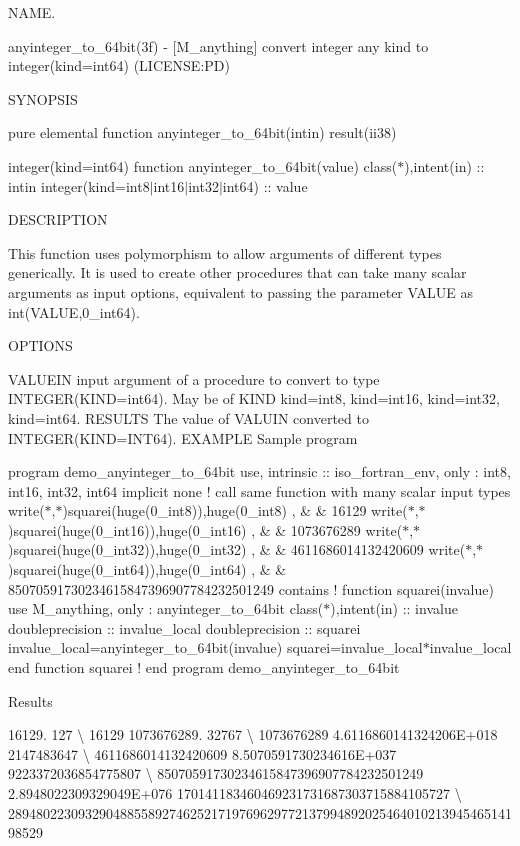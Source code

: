 N\+A\+ME. 

anyinteger\+\_\+to\+\_\+64bit(3f) -\/ \mbox{[}M\+\_\+anything\mbox{]} convert integer any kind to integer(kind=int64) (L\+I\+C\+E\+N\+SE\+:PD)

S\+Y\+N\+O\+P\+S\+IS

pure elemental function anyinteger\+\_\+to\+\_\+64bit(intin) result(ii38)

integer(kind=int64) function anyinteger\+\_\+to\+\_\+64bit(value) class($\ast$),intent(in) \+:\+: intin integer(kind=int8$\vert$int16$\vert$int32$\vert$int64) \+:\+: value

D\+E\+S\+C\+R\+I\+P\+T\+I\+ON

This function uses polymorphism to allow arguments of different types generically. It is used to create other procedures that can take many scalar arguments as input options, equivalent to passing the parameter V\+A\+L\+UE as int(\+V\+A\+L\+U\+E,0\+\_\+int64).

O\+P\+T\+I\+O\+NS

V\+A\+L\+U\+E\+IN input argument of a procedure to convert to type I\+N\+T\+E\+G\+ER(K\+I\+ND=int64). May be of K\+I\+ND kind=int8, kind=int16, kind=int32, kind=int64. R\+E\+S\+U\+L\+TS The value of V\+A\+L\+U\+IN converted to I\+N\+T\+E\+G\+ER(K\+I\+ND=I\+N\+T64). E\+X\+A\+M\+P\+LE Sample program

program demo\+\_\+anyinteger\+\_\+to\+\_\+64bit use, intrinsic \+:\+: iso\+\_\+fortran\+\_\+env, only \+: int8, int16, int32, int64 implicit none ! call same function with many scalar input types write($\ast$,$\ast$)squarei(huge(0\+\_\+int8)),huge(0\+\_\+int8) , \& \& \textquotesingle{}16129\textquotesingle{} write($\ast$,$\ast$)squarei(huge(0\+\_\+int16)),huge(0\+\_\+int16) , \& \& \textquotesingle{}1073676289\textquotesingle{} write($\ast$,$\ast$)squarei(huge(0\+\_\+int32)),huge(0\+\_\+int32) , \& \& \textquotesingle{}4611686014132420609\textquotesingle{} write($\ast$,$\ast$)squarei(huge(0\+\_\+int64)),huge(0\+\_\+int64) , \& \& \textquotesingle{}85070591730234615847396907784232501249\textquotesingle{} contains ! function squarei(invalue) use M\+\_\+anything, only \+: anyinteger\+\_\+to\+\_\+64bit class($\ast$),intent(in) \+:\+: invalue doubleprecision \+:\+: invalue\+\_\+local doubleprecision \+:\+: squarei invalue\+\_\+local=anyinteger\+\_\+to\+\_\+64bit(invalue) squarei=invalue\+\_\+local$\ast$invalue\+\_\+local end function squarei ! end program demo\+\_\+anyinteger\+\_\+to\+\_\+64bit

Results

16129. 127 \textbackslash{} 16129 1073676289. 32767 \textbackslash{} 1073676289 4.\+6116860141324206E+018 2147483647 \textbackslash{} 4611686014132420609 8.\+5070591730234616E+037 9223372036854775807 \textbackslash{} 85070591730234615847396907784232501249 2.\+8948022309329049E+076 170141183460469231731687303715884105727 \textbackslash{} 28948022309329048855892746252171976962977213799489202546401021394546514198529

